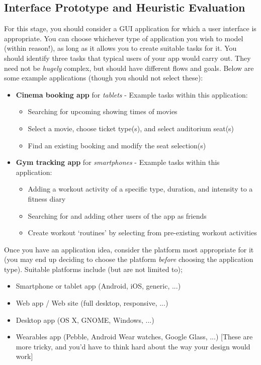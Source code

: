 \documentclass[11pt,a4paper]{report}
\begin{document}
\subsection*{Interface Prototype and Heuristic Evaluation}
For this stage, you should consider a GUI application for which a user interface is appropriate. You can choose whichever type of application you wish to model (within reason!), as long as it allows you to create suitable tasks for it. You should identify three tasks that typical users of your app would carry out. They need not be \textit{hugely} complex, but should have different flows and goals. Below are some example applications (though you should not select these):
\begin{itemize} 
    \item \textbf{Cinema booking app} for \textit{tablets} - Example tasks within this application:
        \begin{itemize}
            \item Searching for upcoming showing times of movies
            \item Select a movie, choose ticket type(s), and select auditorium seat(s)
            \item Find an existing booking and modify the seat selection(s)
        \end{itemize}
   \item \textbf{Gym tracking app} for \textit{smartphones} - Example tasks within this application:
        \begin{itemize}
            \item Adding a workout activity of a specific type, duration, and intensity to a fitness diary
            \item Searching for and adding other users of the app as friends 
            \item Create workout `routines' by selecting from pre-existing workout activities
        \end{itemize}
\end{itemize}
Once you have an application idea, consider the platform most appropriate for it (you may end up deciding to choose the platform \textit{before} choosing the application type). Suitable platforms include (but are not limited to);
\begin{itemize}
    \item Smartphone or tablet app (Android, iOS, generic, ...)
    \item Web app / Web site (full desktop, responsive, ...)
    \item Desktop app (OS X, GNOME, Windows, ...)
    \item Wearables app (Pebble, Android Wear watches, Google Glass, ...) [These are more tricky, and you'd have to think hard about the way your design would work]
\end{itemize}
\end{document}
